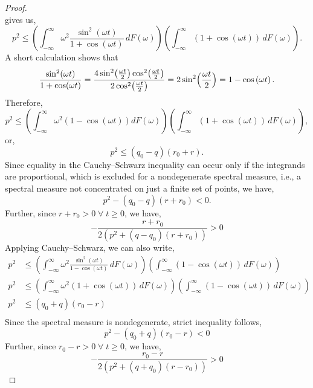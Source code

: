 \documentclass[journal]{IEEEtran}
\theoremstyle{plain}
\theoremstyle{definition}
\theoremstyle{remark}
\begin{document}
\begin{proof}
\begin{equation}
\end{equation}
gives us,
\begin{equation}
    p^2\le \left(\int_{-\infty}^{\infty}\omega^2\frac{\sin^2(\omega t)}{1+\cos(\omega t)}\,dF(\omega)\right)
    \left(\int_{-\infty}^{\infty}(1+\cos(\omega t))\,dF(\omega)\right).
\end{equation}
A short calculation shows that
\begin{equation}
    \frac{\sin^2(\omega t)}{1+\cos(\omega t)}
    =\frac{4\sin^2\bigl(\frac{\omega t}{2}\bigr)\cos^2\bigl(\frac{\omega t}{2}\bigr)}
    {2\cos^2\bigl(\frac{\omega t}{2}\bigr)}
    =2\sin^2\Bigl(\frac{\omega t}{2}\Bigr) = 1 - \cos\left(\omega t\right).
\end{equation}
Therefore,
\begin{equation}
    p^2\le \left(\int_{-\infty}^{\infty}\omega^2\left(1 - \cos\left(\omega t\right)\right)dF(\omega)\right)\left(\int_{-\infty}^{\infty}(1+\cos(\omega t))\,dF(\omega)\right),
\end{equation}
or,
\begin{equation}
    p^2 \leq \left(q_0-q\right) \left(r_0+r\right).
\end{equation}
Since equality in the Cauchy--Schwarz inequality can occur only if the integrands are proportional, which is excluded for a nondegenerate spectral measure, i.e., a spectral measure not concentrated on just a finite set of points, we have,
\begin{equation}
    p^2-(q_0-q)(r+r_0)<0.
\end{equation}
Further, since $r+r_0>0\; \forall \;t \geq 0$, we have,
\begin{equation}
 -\frac{r+r_0}{2\left(p^2+(q-q_0)(r+r_0)\right)} > 0 
\end{equation}
Applying Cauchy--Schwarz, we can also write,
\begin{equation}
\begin{split}
    p^2 &\leq \left(\int_{-\infty}^{\infty}\omega^2\frac{\sin^2(\omega t)}{1-\cos(\omega t)}\,dF(\omega)\right)
    \left(\int_{-\infty}^{\infty}(1-\cos(\omega t))\,dF(\omega)\right) \\
    p^2 &\leq \left(\int_{-\infty}^{\infty}\omega^2\left(1+\cos(\omega t)\right)\,dF(\omega)\right)
    \left(\int_{-\infty}^{\infty}(1-\cos(\omega t))\,dF(\omega)\right) \\
    p^2 &\leq \left(q_0+q\right)\left(r_0-r\right) \\
\end{split}
\end{equation}
Since the spectral measure is nondegenerate, strict inequality follows,
\begin{equation}
    p^2 -\left(q_0+q\right)\left(r_0-r\right) < 0
\end{equation}
Further, since $r_0-r>0\; \forall \;t \geq 0$, we have,
\begin{equation}
 -\frac{r_0-r}{2\left(p^2+(q+q_0)(r-r_0)\right)} > 0 
\end{equation}
\end{proof}
\end{document}
